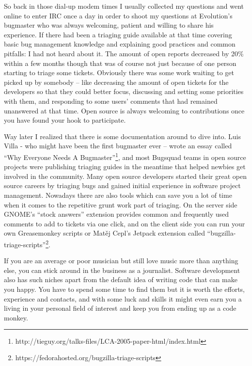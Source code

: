 So back in those dial-up modem times I usually collected my questions and went online to enter IRC once a day in order to shoot my questions at Evolution's bugmaster who was always welcoming, patient and willing to share his experience. If there had been a triaging guide available at that time covering basic bug management knowledge and explaining good practices and common pitfalls: I had not heard about it.
The amount of open reports decreased by 20\% within a few months though that was of course not just because of one person starting to triage some tickets. Obviously there was some work waiting to get picked up by somebody -- like decreasing the amount of open tickets for the developers so that they could better focus, discussing and setting some priorities with them, and responding to some users' comments that had remained unanswered at that time. Open source is always welcoming to contributions once you have found your hook to participate.

Way later I realized that there is some documentation around to dive into. Luis Villa - who might have been the first bugmaster ever -- wrote an essay called ``Why Everyone Needs A Bugmaster''\footnote{{http://tieguy.org/talks-files/LCA-2005-paper-html/index.html}}, and most Bugsquad teams in open source projects were publishing triaging guides in the meantime that helped newbies get involved in the community. Many open source developers started their great open source careers by triaging bugs and gained initial experience in software project management.
Nowadays there are also tools which can save you a lot of time when it comes to the repetitive grunt work part of triaging. On the server side GNOME's ``stock answers'' extension provides common and frequently used comments to add to tickets via one click, and on the client side you can run your own Greasemonkey scripts or Matěj Cepl's Jetpack extension called ``bugzilla-triage-scripts''\footnote{{https://fedorahosted.org/bugzilla-triage-scripts}}.

If you are an average or poor musician but still love music more than anything else, you can stick around in the business as a journalist.
Software development also has such niches apart from the default idea of writing code that can make you happy. You have to spend some time to find them but it is worth the efforts, experience and contacts, and with some luck and skills it might even earn you a living in your personal field of interest and keep you from ending up as a code monkey.
